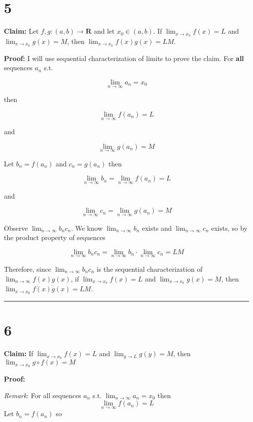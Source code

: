 \documentclass[10pt,letterpaper]{article}
\newcommand\R{\mathbf{R}}
\newcommand\ds{\displaystyle}
\newcommand\qedsym{\hfill \rule{2mm}{2mm}}
\begin{document}
\section*{5}

\textbf{Claim:} Let $f,g:(a, b)\rightarrow\R$ and let $x_0\in(a, b)$. If $\ds\lim_{x\to x_0} f(x) = L$ and $\ds\lim_{x\to x_0} g(x) = M$, then $\ds\lim_{x\to x_0} f(x)g(x) = LM$.

\medskip

\textbf{Proof:} I will use sequential characterization of limits to prove the claim. For \textbf{all} sequences $a_n$ s.t.

\[\ds\lim_{n\to\infty} a_n = x_0\]

then 

\[\ds\lim_{n\to\infty}f(a_n) = L\]

and

\[\ds\lim_{n\to\infty}g(a_n) = M\]

Let $b_n = f(a_n)$ and $c_n = g(a_n)$ then

\[\ds\lim_{n\to\infty}b_n = \ds\lim_{n\to\infty}f(a_n) = L\]

and

\[\ds\lim_{n\to\infty}c_n = \ds\lim_{n\to\infty}g(a_n) = M\]

Observe $\ds\lim_{n\to\infty}b_nc_n$. We know $\ds\lim_{n\to\infty}b_n$ exists and $\ds\lim_{n\to\infty}c_n$ exists, so by the product property of sequences

\[\ds\lim_{n\to\infty}b_nc_n = \ds\lim_{n\to\infty}b_n \cdot \ds\lim_{n\to\infty}c_n = LM\]

Therefore, since $\ds\lim_{n\to\infty}b_nc_n$ is the sequential characterization of $\ds\lim_{n\to\infty}f(x)g(x)$, if $\ds\lim_{x\to x_0} f(x) = L$ and $\ds\lim_{x\to x_0} g(x) = M$, then $\ds\lim_{x\to x_0} f(x)g(x) = LM$.

\qedsym

\section*{6}

\textbf{Claim:} If $\ds\lim_{x\to x_0} f(x) = L$ and $\ds\lim_{y\to L} g(y) = M$, then $\ds\lim_{x\to x_0} g \circ f(x) = M$

\medskip

\textbf{Proof:}

\textit{Remark}: For all sequences $a_n$ s.t. $\ds\lim_{n\to\infty} a_n = x_0$ then 
\[\lim_{n\to\infty} f(a_n) = L\]
Let $b_n = f(a_n)$ so 
\end{document}
